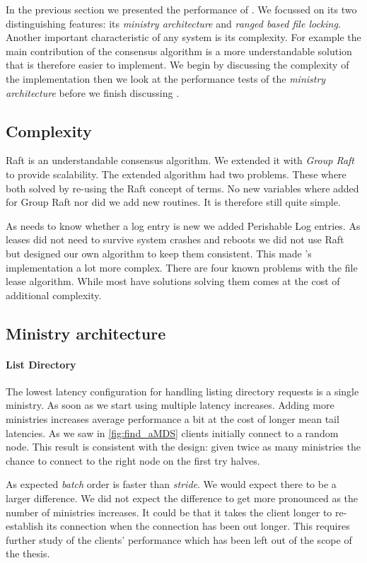 In the previous section we presented the performance of \name{}. We focussed on its two distinguishing features: its \textit{ministry architecture} and \textit{ranged based file locking}. Another important characteristic of any system is its complexity. For example the main contribution of the \raft{} consensus algorithm is a more understandable solution that is therefore easier to implement. We begin by discussing the complexity of the implementation then we look at the performance tests of the \textit{ministry architecture} before we finish discussing .
%
\subsection{Complexity}
Raft is an understandable consensus algorithm. We extended it with \textit{Group Raft} to provide scalability. The extended algorithm had two problems. These where both solved by re-using the Raft concept of terms. No new variables where added for Group Raft nor did we add new routines. It is therefore still quite simple. 

As \name{} needs to know whether a log entry is new we added Perishable Log entries. As leases did not need to survive system crashes and reboots we did not use Raft but designed our own algorithm to keep them consistent. This made \name{}'s implementation a lot more complex. There are four known problems with the file lease algorithm. While most have solutions solving them comes at the cost of additional complexity.
%
\subsection{Ministry architecture}
\paragraph{List Directory}
The lowest latency configuration for handling listing directory requests is a single ministry. As soon as we start using multiple latency increases. Adding more ministries increases average performance a bit at the cost of longer mean tail latencies. As we saw in \cref{fig:find_aMDS} clients initially connect to a random node. This result is consistent with the design: given twice as many ministries the chance to connect to the right node on the first try halves. 

As expected \textit{batch} order is faster than \textit{stride}. We would expect there to be a larger difference. We did not expect the difference to get more pronounced as the number of ministries increases. It could be that it takes the client longer to re-establish its connection when the connection has been out longer. This requires further study of the clients' performance which has been left out of the scope of the thesis.

